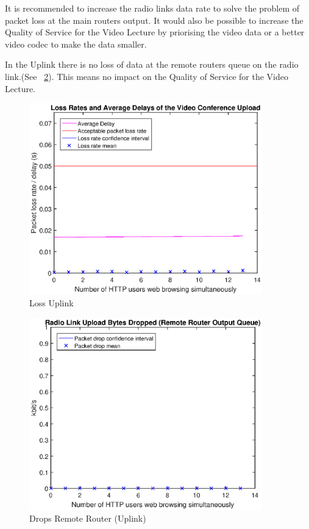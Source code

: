 \documentclass[a4paper,10pt]{book}\usepackage{graphicx}
\begin{document}
It is recommended to increase the radio links data rate to solve the problem of packet loss at the main routers output. It would also be possible to increase the Quality of Service for the Video Lecture 
by priorising the video data or a better video codec to make the data smaller.

In the Uplink there is no loss of data at the remote routers queue on the radio link.(See ~\ref{fig:remoteRdrops}).
This means no impact on the Quality of Service for the Video Lecture.
\begin{figure}[!ht]
  \centering
  
    \includegraphics[width=0.9\textwidth]{off_loss_conf_upload.eps}
    \caption{Loss Uplink}
     \label{fig:losslecup}
\end{figure}
\begin{figure}[!ht]
  \centering
    \includegraphics[width=0.9\textwidth]{on_remote_router_drops.eps}
    \caption{Drops Remote Router (Uplink)}
     \label{fig:remoteRdrops}
\end{figure}
\end{document}
